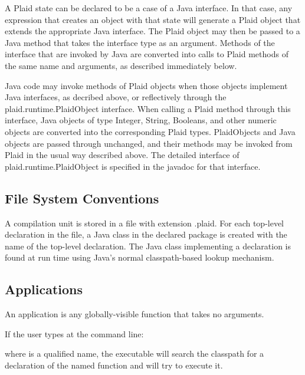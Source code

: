   A Plaid state can be declared to
be a case of a Java interface.  In that case, any 
expression that creates an object with that state will generate a
Plaid object that extends the appropriate Java interface.  The Plaid
object may then be passed to a Java method that takes the interface
type as an argument.  Methods of the interface that are invoked by
Java are converted into calls to Plaid methods of the same name and
arguments, as described immediately below.

  Java code may invoke methods of
Plaid objects when those objects implement Java interfaces, as
decribed above, or reflectively through the plaid.runtime.PlaidObject
interface.  When calling a Plaid method through this interface, Java
objects of type Integer, String, Booleans, and other numeric objects
are converted into the corresponding Plaid types.  PlaidObjects and
Java objects are passed through unchanged, and their methods may be
invoked from Plaid in the usual way described above.  The detailed
interface of plaid.runtime.PlaidObject is specified in the javadoc
for that interface.


\subsection{File System Conventions}

A compilation unit is stored in a file with extension .plaid.  For each
top-level declaration in the file, a Java class in the declared package
is created with the name of the top-level declaration.  The Java class
implementing a declaration is found at run time using Java's normal
classpath-based lookup mechanism.

\subsection{Applications}

An application is any globally-visible function that takes no arguments.

\noindent
If the user types at the command line:

\begin{quote}
\end{quote}

\noindent
where  is a qualified name, the 
executable will search the classpath for a declaration of the named
function and will try to execute it.

